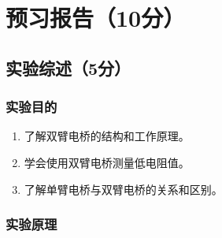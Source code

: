\documentclass[]{../../templates/Report}%
\begin{document}
\maketitle%

\section{预习报告（10分）}

\subsection{实验综述（5分）}
\subsubsection{实验目的}
\begin{enumerate}
    \item 了解双臂电桥的结构和工作原理。
    \item 学会使用双臂电桥测量低电阻值。
    \item 了解单臂电桥与双臂电桥的关系和区别。
\end{enumerate}
\subsubsection{实验原理}
\end{document}
